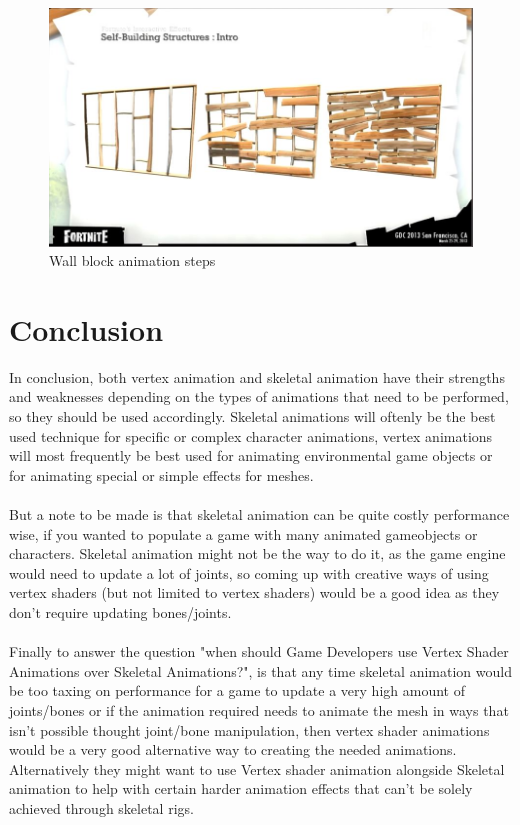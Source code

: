 \documentclass{scrartcl}
\begin{document}
\begin{figure}[h!]
  \centering
  \includegraphics[scale=0.5]{wallimg.jpg}
  \caption{Wall block animation steps}
  \label{fig:wall}
\end{figure}

\section{Conclusion}
In conclusion, both vertex animation and skeletal animation have their strengths and weaknesses depending on the types of animations that need to be performed, so they should be used accordingly. Skeletal animations will oftenly be the best used technique for specific or complex character animations, vertex animations will most frequently be best used for animating environmental game objects or for animating special or simple effects for meshes.
\\~\\
But a note to be made is that skeletal animation can be quite costly performance wise, if you wanted to populate a game with many animated gameobjects or characters. Skeletal animation might not be the way to do it, as the game engine would need to update a lot of joints, so coming up with creative ways of using vertex shaders (but not limited to vertex shaders) would be a good idea as they don't require updating bones/joints.
\\~\\
Finally to answer the question "when should Game Developers use Vertex Shader Animations over Skeletal Animations?", is that any time skeletal animation would be too taxing on performance for a game to update a very high amount of joints/bones or if the animation required needs to animate the mesh in ways that isn't possible thought joint/bone manipulation, then vertex shader animations would be a very good alternative way to creating the needed animations. Alternatively they might want to use Vertex shader animation alongside Skeletal animation to help with certain harder animation effects that can't be solely achieved through skeletal rigs.



\end{document}
